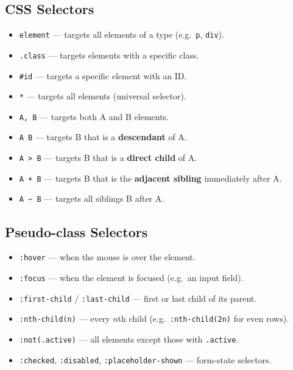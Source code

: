 \documentclass[hidelinks]{article}
\begin{document}
\subsection{CSS Selectors}
\begin{itemize}
  \item \texttt{element} --- targets all elements of a type (e.g.\ \texttt{p}, \texttt{div}).
  \item \texttt{.class} --- targets elements with a specific class.
  \item \texttt{\#id} --- targets a specific element with an ID.
  \item \texttt{*} --- targets all elements (universal selector).
  \item \texttt{A, B} --- targets both A and B elements.
  \item \texttt{A B} --- targets B that is a \textbf{descendant} of A.
  \item \texttt{A > B} --- targets B that is a \textbf{direct child} of A.
  \item \texttt{A + B} --- targets B that is the \textbf{adjacent sibling} immediately after A.
  \item \texttt{A \textasciitilde{} B} --- targets all siblings B after A.
\end{itemize}

\subsection{Pseudo-class Selectors}
\begin{itemize}
  \item \texttt{:hover} --- when the mouse is over the element.
  \item \texttt{:focus} --- when the element is focused (e.g.\ an input field).
  \item \texttt{:first-child} / \texttt{:last-child} --- first or last child of its parent.
  \item \texttt{:nth-child(n)} --- every $n$th child (e.g.\ \texttt{:nth-child(2n)} for even rows).
  \item \texttt{:not(.active)} --- all elements except those with \texttt{.active}.
  \item \texttt{:checked}, \texttt{:disabled}, \texttt{:placeholder-shown} --- form-state selectors.
\end{itemize}
\end{document}
